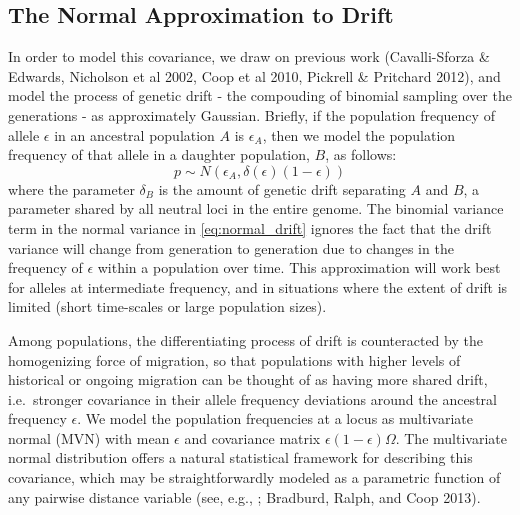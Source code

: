 \documentclass[12pt]{article}
\newcommand{\plrm}[1]{\todo[color=green!20]{#1}}
\newcommand{\plrm}[1]{\plr{#1}}
\newcommand{\plr}[1]{{\it\color{green}{(#1)}}}
\begin{document}
\subsection*{The Normal Approximation to Drift}
In order to model this covariance, we draw on previous work (Cavalli-Sforza \& Edwards, Nicholson et al 2002, Coop et al 2010, Pickrell \& Pritchard 2012), and model the process of genetic drift - the compouding of binomial sampling over the generations - as approximately Gaussian.  
\plr{Let's frame this not in tree-land? And separate calculations of covariance (general) from Gaussian assumption?
Instead, could set up like: ``
The covariance between allele frequencies is given by a function of their unknown shared history (which we could write down here if it's the place for it?); 
in simple treelike models it looks like this: now pretend, as others have, that allele frequencies are Gaussian.''}
Briefly, if the population frequency of allele $\epsilon$ in an ancestral population $A$ is $\epsilon_A$, then we model the population frequency of that allele in a daughter population, $B$, as follows:
\begin{equation}
\label{eq:normal_drift}
p \sim N(\epsilon_A,\delta (\epsilon)(1-\epsilon))
\end{equation}
where the parameter  $\delta_B$ is the amount of genetic drift \plrm{define ``amount of drift''?}  separating $A$ and $B$, a parameter shared by all neutral loci in the entire genome.  The binomial variance term in the normal variance in \eqref{eq:normal_drift} ignores the fact that the drift variance will change from generation to generation due to changes in the frequency of $\epsilon$ within a population over time.  This approximation will work best for alleles at intermediate frequency, and in situations where the extent of drift is limited (short time-scales or large population sizes). 

Among populations, the differentiating process of drift is counteracted by the homogenizing force of migration, so that populations with higher levels of historical or ongoing migration can be thought of as having more shared drift, i.e.\ stronger covariance in their allele frequency deviations around the ancestral frequency $\epsilon$. We model the population frequencies at a locus \plr{with allele frequency $\epsilon$} as multivariate normal (MVN) with mean $\epsilon$ and covariance matrix $\epsilon (1-\epsilon)\Omega$. The multivariate normal distribution offers a natural statistical framework for describing this covariance, 
\plr{in the setup so far, we are modeling allele frequencies, not the covariance (haven't said that empirical covariance is a sufficient statistic), so the framework is for describing the allele frequencies, and we then put a parametric form on the covariance? 
Hm, to transition into next paragraph need some description of why we are modeling the covariance.}
which may be straightforwardly modeled as a parametric function of any pairwise distance variable (see, e.g., \plr{others, first}; Bradburd, Ralph, and Coop 2013). 
\end{document}
